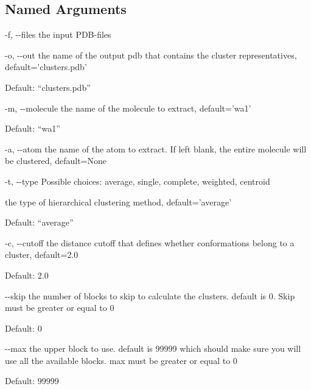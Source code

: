 \documentclass[letterpaper,10pt,english]{sphinxmanual}
\begin{document}
\subsection{Named Arguments}
\label{\detokenize{tools:Named Arguments}}\begin{optionlist}{3cm}
\item [-f, -{-}files]  
the input PDB-files
\item [-o, -{-}out]  
the name of the output pdb that contains the cluster representatives, default=’clusters.pdb’

Default: “clusters.pdb”
\item [-m, -{-}molecule]  
the name of the molecule to extract, default=’wa1’

Default: “wa1”
\item [-a, -{-}atom]  
the name of the atom to extract. If left blank, the entire molecule will be clustered, default=None
\item [-t, -{-}type]  
Possible choices: average, single, complete, weighted, centroid

the type of hierarchical clustering method, default=’average’

Default: “average”
\item [-c, -{-}cutoff]  
the distance cutoff that defines whether conformations belong to a cluster, default=2.0

Default: 2.0
\item [-{-}skip]  
the number of blocks to skip to calculate the clusters. default is 0. Skip must be greater or equal to 0

Default: 0
\item [-{-}max]  
the upper block to use. default is 99999 which should make sure you will use all the available blocks. max must be greater or equal to 0

Default: 99999
\end{optionlist}


%
\begin{sphinxVerbatim}[commandchars=\\\{\}]
  
   
    
    
\end{sphinxVerbatim}
\end{document}

